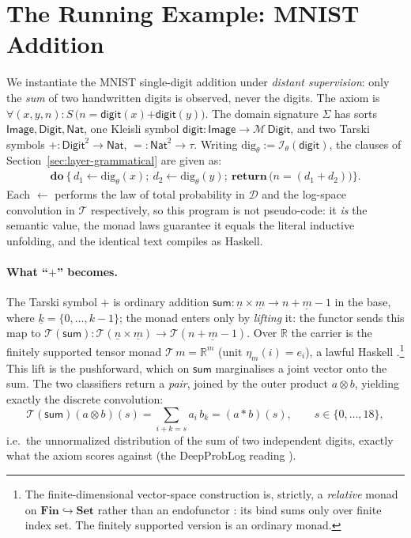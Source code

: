 \documentclass[anon]{../../journal-templates/NeSy26/nesy2026} %
\begin{document}
\section{The Running Example: MNIST Addition}
\label{sec:mnist}

We instantiate the MNIST single-digit addition under \emph{distant supervision}: only the
\emph{sum} of two handwritten digits is observed, never the digits. The axiom is
$\forall (x,y,n){:}S \, \bigl(n \mathrel{\mathsf{=}} \mathsf{digit}(x) \mathrel{\mathsf{+}} \mathsf{digit}(y)\bigr)$.
The domain signature $\Sigma$ has sorts $\mathsf{Image},\mathsf{Digit},\mathsf{Nat}$, one
Kleisli symbol $\mathsf{digit}:\mathsf{Image}\to\mathcal M\,\mathsf{Digit}$, and two Tarski
symbols $\mathsf{+}:\mathsf{Digit}^2\to\mathsf{Nat}$, $\mathsf{=}:\mathsf{Nat}^2\to\tau$. Writing
$\mathrm{dig}_\theta:=\mathcal I_\theta(\mathsf{digit})$, the clauses of
Section~\ref{sec:layer-grammatical} are given as:
\[
  \begin{aligned}
\mathbf{do}\ \bigl\{\, d_1 \leftarrow \mathrm{dig}_\theta(x);\ d_2 \leftarrow \mathrm{dig}_\theta(y);\
       \mathbf{return}\,\bigl(n \mathrel{{=}} (d_1 \mathrel{{+}} d_2)\bigr) \bigr\}.
  \end{aligned}
\]
\noindent
Each $\leftarrow$ performs the law of total
probability in $\mathcal{D}$ and the log-space convolution in $\mathcal{T}$ respectively, so this
program is not pseudo-code: it \emph{is} the semantic value, the monad laws guarantee it
equals the literal inductive unfolding, and the identical text compiles as Haskell.

\paragraph{What ``$+$'' becomes.} The Tarski symbol $\mathsf{+}$ is ordinary addition
$\mathsf{sum}:\underline n\times\underline m\to\underline{n{+}m{-}1}$ in the base, where $\underline k=\{0,\dots,k-1\}$; the monad enters
only by \emph{lifting} it: the functor sends this map to $\mathcal{T}(\mathsf{sum})\colon\mathcal{T}(\underline n\times\underline m)\to\mathcal{T}(\underline{n{+}m{-}1})$. Over $\mathbb R$ the carrier is the finitely supported tensor monad
$\mathcal{T}\,m=\mathbb R^m$ (unit $\eta_m(i)=e_i$), a lawful Haskell
\minth{Monad}.\footnote{The finite-dimensional vector-space construction is, strictly, a
\emph{relative} monad on $\mathbf{Fin}\hookrightarrow\mathbf{Set}$ rather than an
endofunctor \citep{altenkirchMonadsNotEndofunctors2015}: its bind sums only over finite index set. The finitely supported version is an ordinary monad.} This lift is the pushforward, which on $\mathsf{sum}$
marginalises a joint vector onto the sum. The two classifiers return a \emph{pair}, joined by the outer product $a\otimes b$, yielding
exactly the discrete convolution:
\[
  \mathcal{T}(\mathsf{sum})(a\otimes b)(s) = \textstyle\sum_{i+k=s} a_i\,b_k = (a * b)(s),\qquad s\in\{0,\dots,18\},
\]
i.e.\ the unnormalized distribution of the sum of two independent digits, exactly what the axiom scores against
(the DeepProbLog reading \citep{DBLP:journals/ai/ManhaeveDKDR21}).
\end{document}
